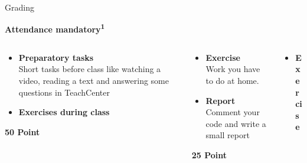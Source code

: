 \documentclass[aspectratio=169]{beamer}
\begin{document}
\begin{frame}{Grading}
    \begin{coloredblock}[turquoise]
        \centering\footnotesize\textbf{Attendance mandatory\textsuperscript{1}}
    \end{coloredblock}

    \vspace{-0.5cm}
    \begin{columns}
        \begin{column}{0.32\textwidth}
            \begin{coloredblock}
                \begin{itemize}
                    \item \footnotesize \textbf{Preparatory tasks}\\
                    Short tasks before class like watching a video, reading a text and answering some questions in TeachCenter
                    \item \footnotesize \textbf{Exercises during class}
                \end{itemize}
            \end{coloredblock}
            \centering \footnotesize \textbf{50 Point}
        \end{column}
        \begin{column}{0.32\textwidth}
            \begin{coloredblock}
                \begin{itemize}
                    \item \footnotesize \textbf{Exercise}\\
                    Work you have to do at home.
                    \item \footnotesize \textbf{Report}\\
                    Comment your code and write a small report
                \end{itemize}
            \end{coloredblock}
            \centering \footnotesize \textbf{25 Point}
        \end{column}
        \begin{column}{0.32\textwidth}
            \begin{coloredblock}
                \begin{itemize}
                    \item \footnotesize \textbf{Exercise}\\

\end{itemize}
\end{coloredblock}
\end{column}
\end{columns}
\end{frame}
\end{document}
